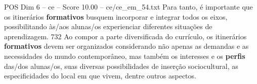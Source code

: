 \begin{textsample}{POS Dim 6 – ce – Score 10.00 – ce/ce\_em\_54.txt}
Para tanto, é importante que os itinerários \textbf{formativos} busquem incorporar e integrar todos os eixos, possibilitando às/aos alunas/os experienciar diferentes situações de aprendizagem. 732 Ao compor a parte diversificada do currículo, os itinerários \textbf{formativos} devem ser organizados considerando não apenas as demandas e as necessidades do mundo contemporâneo, mas também os interesses e os \textbf{perfis} das/dos alunas/os, suas diversas possibilidades de inserção sociocultural, as especificidades do local em que vivem, dentre outros aspectos.

\end{textsample}
